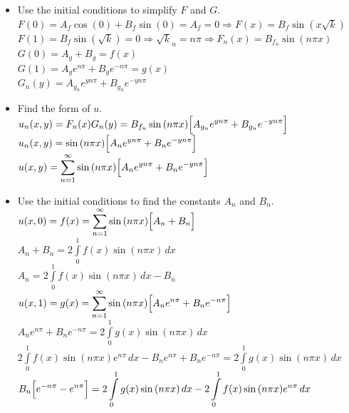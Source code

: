 \documentclass[10pt]{article}
\begin{document}
\begin{itemize}
    \item Use the initial conditions to simplify $ F $ and $ G $. \\
    \subitem $ \displaystyle F(0) = A_{f}\cos{(0)} + B_{f}\sin{(0)} = A_{f} = 0 \Rightarrow F(x) = B_{f}\sin{(x\sqrt{k})} $ \\
    \subitem $ \displaystyle F(1) = B_{f}\sin{(\sqrt{k})} = 0 \Rightarrow \sqrt{k}_n = n\pi \Rightarrow F_n(x) = B_{f_n}\sin{(n\pi x)} $ \\
    \subitem $ \displaystyle G(0) = A_{g} + B_{g} = f(x) $ \\
    \subitem $ \displaystyle G(1) = A_{g}e^{n\pi } + B_{g}e^{-n\pi } = g(x) $ \\
    \subitem $ \displaystyle G_n(y) = A_{g_n}e^{yn\pi} + B_{g_n}e^{-yn\pi} $ \\
    \item Find the form of $ u $. \\
    \subitem $ \displaystyle u_n(x,y) = F_n(x)G_n(y) = B_{f_n}\sin{(n\pi x)}\Bigl[A_{g_n}e^{yn\pi} + B_{g_n}e^{-yn\pi}\Bigr] $ \\
    \subitem $ \displaystyle u_n(x,y) = \sin{(n\pi x)}\Bigl[A_{n}e^{yn\pi } + B_{n}e^{-yn\pi }\Bigr] $ \\
    \subitem $ \displaystyle u(x,y) = \sum \limits_{n=1}^{\infty} \sin{(n\pi x)}\Bigl[A_{n}e^{yn\pi } + B_{n}e^{-yn\pi }\Bigr] $ \\
    \item Use the initial conditions to find the constants $ A_n $ and $ B_n $. \\
    \subitem $ \displaystyle u(x,0) = f(x) = \sum \limits_{n=1}^{\infty} \sin{(n\pi x)}\Bigl[A_{n} + B_{n}\Bigr] $ \\
    \subitem $ \displaystyle A_{n} + B_{n} = 2 \int \limits_{0}^{1} f(x) \sin{(n\pi x)} \,dx $ \\
    \subitem $ \displaystyle A_{n} = 2 \int \limits_{0}^{1} f(x) \sin{(n\pi x)} \,dx - B_{n} $ \\
    \subitem $ \displaystyle u(x,1) = g(x) = \sum \limits_{n=1}^{\infty} \sin{(n\pi x)}\Bigl[A_{n}e^{n\pi} + B_{n}e^{-n\pi}\Bigr] $ \\ 
    \subitem $ \displaystyle A_{n}e^{n\pi} + B_{n}e^{-n\pi} = 2 \int \limits_{0}^{1} g(x) \sin{(n\pi x)} \,dx $ \\
    \subitem $ \displaystyle 2 \int \limits_{0}^{1} f(x) \sin{(n\pi x)}e^{n\pi} \,dx - B_{n}e^{n\pi} + B_{n}e^{-n\pi} = 2 \int \limits_{0}^{1} g(x) \sin{(n\pi x)} \,dx $ \\
    \subitem $ \displaystyle  B_{n}\Bigl[e^{-n\pi} - e^{n\pi}\Bigr] = 2 \int \limits_{0}^{1} g(x) \sin{(n\pi x)} \,dx - 2 \int \limits_{0}^{1} f(x) \sin{(n\pi x)}e^{n\pi} \,dx $ \\

\end{itemize}
\end{document}
